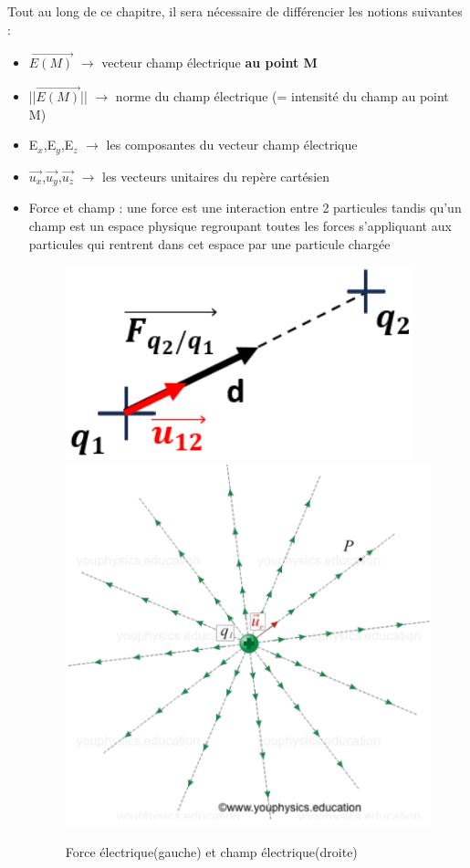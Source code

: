 \documentclass{article}
\begin{document}
Tout au long de ce chapitre, il sera nécessaire de différencier les notions suivantes :
\begin{itemize}
    \item $\overrightarrow{E(M)}$ $\rightarrow$ vecteur champ électrique \textbf{au point M}
    \item ||$\overrightarrow{E(M)}$|| $\rightarrow$ norme du champ électrique (= intensité du champ au point M)
    \item E$_{x}$,E$_{y}$,E$_{z}$ $\rightarrow$ les composantes du vecteur champ électrique
    \item $\overrightarrow{u_{x}}$,$\overrightarrow{u_{y}}$,$\overrightarrow{u_{z}}$ $\rightarrow$ les vecteurs unitaires du repère cartésien \newpage
    \item Force et champ : une force est une interaction entre 2 particules tandis qu'un champ est un espace physique regroupant toutes les forces s'appliquant aux particules qui rentrent dans cet espace par une particule chargée
    \begin{figure}[h]
        \centering
        \includegraphics[scale=0.3]{figure2.png}
        \includegraphics[scale=0.3]{figure2bis.png}
        \caption{Force électrique(gauche) et champ électrique(droite)}
    \end{figure}
\end{itemize}
\end{document}
